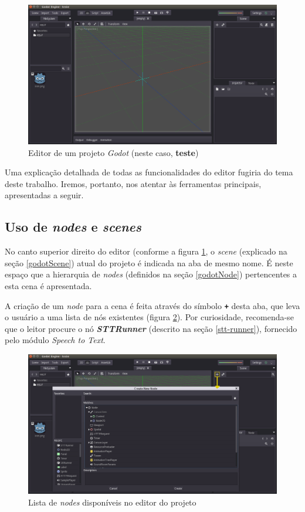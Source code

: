 \begin{figure}[H]
  \centering
  \includegraphics[width=.9\textwidth]{image/in-game-editor}
  \caption{Editor de um projeto \textit{Godot} (neste caso, \textbf{teste})}
  \label{in-game-editor}
\end{figure}

Uma explicação detalhada de todas as funcionalidades do editor fugiria do tema deste trabalho. Iremos, portanto, nos atentar às ferramentas principais, apresentadas a seguir.


\subsection{Uso de \textit{nodes} e \textit{scenes}}

No canto superior direito do editor (conforme a figura \ref{in-game-editor}, o \textit{scene} (explicado na seção \ref{godotScene}) atual do projeto é indicada na aba de mesmo nome. É neste espaço que a hierarquia de \textit{nodes} (definidos na seção \ref{godotNode}) pertencentes a esta cena é apresentada.

A criação de um \textit{node} para a cena é feita através do símbolo \textbf{\texttt{+}} desta aba, que leva o usuário a uma lista de nós existentes (figura \ref{editor-node}). Por curiosidade, recomenda-se que o leitor procure o nó \textbf{\textit{STTRunner}} (descrito na seção \ref{stt-runner}), fornecido pelo módulo \textit{Speech to Text}.

\begin{figure}[H]
  \centering
  \includegraphics[width=.9\textwidth]{image/editor-node-edit}
  \caption{Lista de \textit{nodes} disponíveis no editor do projeto}
  \label{editor-node}
\end{figure}


